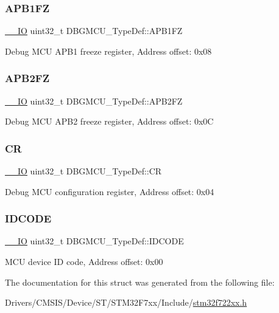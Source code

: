 \subsubsection{\texorpdfstring{APB1FZ}{APB1FZ}}
{\footnotesize\ttfamily \mbox{\hyperlink{core__sc300_8h_aec43007d9998a0a0e01faede4133d6be}{\+\_\+\+\_\+\+IO}} uint32\+\_\+t D\+B\+G\+M\+C\+U\+\_\+\+Type\+Def\+::\+A\+P\+B1\+FZ}

Debug M\+CU A\+P\+B1 freeze register, Address offset\+: 0x08 \mbox{\label{struct_d_b_g_m_c_u___type_def_a011f892d86367dbe786964b14bc515a6}} 
\subsubsection{\texorpdfstring{APB2FZ}{APB2FZ}}
{\footnotesize\ttfamily \mbox{\hyperlink{core__sc300_8h_aec43007d9998a0a0e01faede4133d6be}{\+\_\+\+\_\+\+IO}} uint32\+\_\+t D\+B\+G\+M\+C\+U\+\_\+\+Type\+Def\+::\+A\+P\+B2\+FZ}

Debug M\+CU A\+P\+B2 freeze register, Address offset\+: 0x0C \mbox{\label{struct_d_b_g_m_c_u___type_def_a15981828f2b915d38570cf6684e99a53}} 
\subsubsection{\texorpdfstring{CR}{CR}}
{\footnotesize\ttfamily \mbox{\hyperlink{core__sc300_8h_aec43007d9998a0a0e01faede4133d6be}{\+\_\+\+\_\+\+IO}} uint32\+\_\+t D\+B\+G\+M\+C\+U\+\_\+\+Type\+Def\+::\+CR}

Debug M\+CU configuration register, Address offset\+: 0x04 \mbox{\label{struct_d_b_g_m_c_u___type_def_a0cc3561c124d06bb57dfa855e43ed99f}} 
\subsubsection{\texorpdfstring{IDCODE}{IDCODE}}
{\footnotesize\ttfamily \mbox{\hyperlink{core__sc300_8h_aec43007d9998a0a0e01faede4133d6be}{\+\_\+\+\_\+\+IO}} uint32\+\_\+t D\+B\+G\+M\+C\+U\+\_\+\+Type\+Def\+::\+I\+D\+C\+O\+DE}

M\+CU device ID code, Address offset\+: 0x00 

The documentation for this struct was generated from the following file\+:\begin{DoxyCompactItemize}
\item 
Drivers/\+C\+M\+S\+I\+S/\+Device/\+S\+T/\+S\+T\+M32\+F7xx/\+Include/\mbox{\hyperlink{stm32f722xx_8h}{stm32f722xx.\+h}}\end{DoxyCompactItemize}
